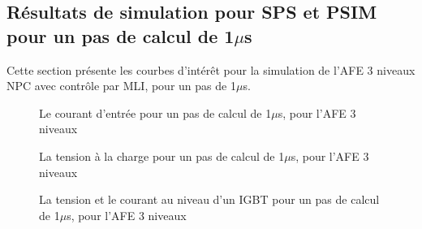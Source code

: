 \clearpage


\subsection{Résultats de simulation pour SPS et PSIM pour un pas de calcul de 1$\mu$s}
Cette section présente les courbes d'intérêt pour la simulation de l'AFE 3 niveaux NPC avec contrôle par MLI, pour un pas de 1$\mu$s. 

\begin{figure}[htb]
\caption{Le courant d'entrée pour un pas de calcul de 1$\mu$s, pour l'AFE 3 niveaux}
\label{AF_3_cou}
\end{figure}


\begin{figure}[htb]
\caption{La tension à la charge pour un pas de calcul de 1$\mu$s, pour l'AFE 3 niveaux}
\label{AF_3_vch}
\end{figure}


\begin{figure}[htb]
\caption{La tension et le courant au niveau d'un IGBT pour un pas de calcul de 1$\mu$s, pour l'AFE 3 niveaux}
\label{AF_3_IGBT}
\end{figure}

